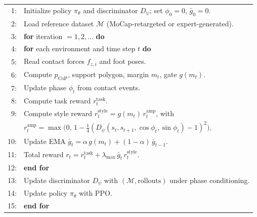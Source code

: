 \documentclass[conference]{IEEEtran}
\begin{document}
\begin{algorithm*}[t]
  \caption{SG-AMP training (Isaac Sim PhysX, MuJoCo sim2sim, PPO, simulation only).}
  \label{alg:sgamp}
  \begin{center}
  \small
  \renewcommand{\arraystretch}{1.12}
  \begin{tabular}{@{}r@{\hspace{1.1em}}l@{}}
    1: & Initialize policy $\pi_\theta$ and discriminator $D_\psi$; set $\phi_0{=}0$, $\bar g_0{=}0$. \\
    2: & Load reference dataset $\mathcal{M}$ (MoCap-retargeted or expert-generated). \\
    3: & \textbf{for} iteration $=1,2,\dots$ \textbf{do} \\
    4: & \hspace{1.6em}\textbf{for} each environment and time step $t$ \textbf{do} \\
    5: & \hspace{3.2em}Read contact forces $f_{z,i}$ and foot poses.  \\
    6: & \hspace{3.2em}Compute $p_{\mathrm{CoP}}$, support polygon, margin $m_t$, gate $g(m_t)$. \quad [contribution 1] \\
    7: & \hspace{3.2em}Update phase $\phi_t$ from contact events. \quad [contribution 2] \\
    8: & \hspace{3.2em}Compute task reward $r^{\mathrm{task}}_t$. \\
    9: & \hspace{3.2em}Compute style reward $r^{\mathrm{style}}_t = g(m_t)\,r^{\mathrm{amp}}_t$, with \\
      & \hspace{4.2em}$r^{\mathrm{amp}}_t = \max\big(0,\,1-\tfrac{1}{4}(D_\psi(s_t,s_{t+1},\cos\phi_t,\sin\phi_t)-1)^2\big)$. \\
    10: & \hspace{3.2em}Update EMA $\bar g_t = \alpha\,g(m_t)+(1-\alpha)\,\bar g_{t-1}$. \quad [contribution 3] \\
    11: & \hspace{3.2em}Total reward $r_t = r^{\mathrm{task}}_t + \lambda_{\max}\,\bar g_t\,r^{\mathrm{style}}_t$. \\
    12: & \hspace{1.6em}\textbf{end for} \\
    13: & Update discriminator $D_\psi$ with $(\mathcal{M},\text{rollouts})$ under phase conditioning. \\
    14: & Update policy $\pi_\theta$ with PPO. \\
    15: & \textbf{end for} \\
  \end{tabular}
  \end{center}
\end{algorithm*}
\end{document}
